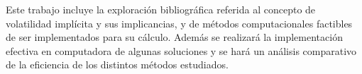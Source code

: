 \documentclass[a4paper,openright, 12pt, oneside]{book}
\begin{document}
\vspace{5mm}

Este trabajo incluye la exploración bibliográfica referida al concepto de volatilidad implícita y sus implicancias, y de métodos computacionales factibles de ser implementados para su cálculo. Además se realizará la implementación efectiva en computadora de algunas soluciones y se hará un análisis comparativo de la eficiencia de los distintos métodos estudiados.




\tableofcontents


















{}


\end{document}
